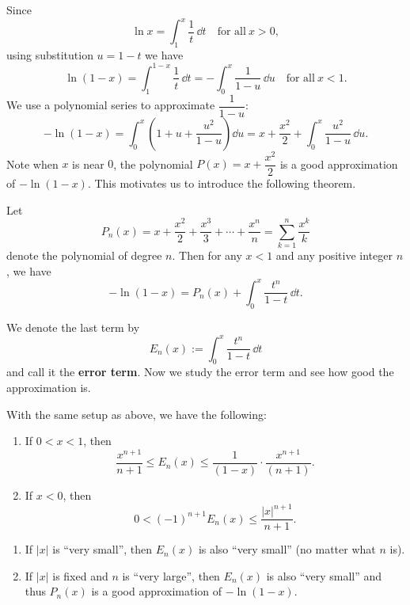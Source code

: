 	\begin{remarkenv}
		Since
		\[
		\ln x = \int_1^x \frac{1}{t}\, \dd t\quad \text{for all}\ x>0,
		\]
		using substitution $u = 1-t$ we have
		\[
		\ln (1-x) = \int_1^{1-x} \frac{1}{t}\, \dd t = -\int_0^x \frac{1}{1-u}\, \dd u \quad \text{for all}\ x<1.
		\]
		We use a polynomial series to approximate $\dfrac{1}{1-u}$:
		\[
		-\ln (1-x) = \int_0^x \left( 1 + u + \frac{u^2}{1-u} \right) \dd u = x + \frac{x^2}{2} + \int_0^x \frac{u^2}{1-u}\, \dd u.
		\]
		Note when $x$ is near $0$, the polynomial $P(x)=x + \dfrac{x^2}{2}$ is a good approximation of $-\ln(1-x)$. This motivates us to introduce the following theorem.
	\end{remarkenv}
	\begin{theoremenv}
		Let
		\[
		P_n(x) = x + \frac{x^2}{2} + \frac{x^3}{3} + \cdots + \frac{x^n}{n} = \sum_{k=1}^n \frac{x^k}{k}
		\]
		denote the polynomial of degree $n$. Then for any $x<1$ and any positive integer $n$, we have
		\[
		-\ln(1-x) = P_n(x) + \int_0^x \frac{t^n}{1-t}\, \dd t.
		\]
	\end{theoremenv}
	\begin{remarkenv}
		We denote the last term by
		\[
		E_n(x) := \int_0^x \frac{t^n}{1-t}\, \dd t
		\]
		and call it the \textbf{error term}. Now we study the error term and see how good the approximation is.
	\end{remarkenv}
	\begin{theoremenv}
		With the same setup as above, we have the following:
		\begin{enumerate}
			\item [(1)] If $0<x<1$, then
			\[
			\frac{x^{n+1}}{n+1} \leq E_n(x) \leq \frac{1}{(1-x)}\cdot\frac{x^{n+1}}{(n+1)}.
			\]
			\item [(2)] If $x<0$, then
			\[
			0 < (-1)^{n+1} E_n(x) \leq \frac{|x|^{n+1}}{n+1}.
			\]
		\end{enumerate}
	\end{theoremenv}
	\begin{remarkenv}
		\begin{enumerate}
			\item [(1)] If $|x|$ is ``very small'', then $E_n(x)$ is also ``very small'' (no matter what $n$ is).
			\item [(2)] If $|x|$ is fixed and $n$ is ``very large'', then $E_n(x)$ is also ``very small'' and thus $P_n(x)$ is a good approximation of $-\ln(1-x)$.
		\end{enumerate}
	\end{remarkenv}
	
